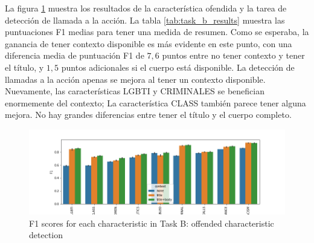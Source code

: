 La figura \ref{fig:task_b_results} muestra los resultados de la característica ofendida y la tarea de detección de llamada a la acción. La tabla \ref{tab:task_b_results} muestra las puntuaciones F1 medias para tener una medida de resumen. Como se esperaba, la ganancia de tener contexto disponible es más evidente en este punto, con una diferencia media de puntuación F1 de $ 7,6 $ puntos entre no tener contexto y tener el título, y $ 1,5 $ puntos adicionales si el cuerpo está disponible. La detección de llamadas a la acción apenas se mejora al tener un contexto disponible. Nuevamente, las características LGBTI y CRIMINALES se benefician enormemente del contexto; La característica CLASS también parece tener alguna mejora. No hay grandes diferencias entre tener el título y el cuerpo completo.

\begin{figure}[t]
    \centering
    \includegraphics[width=\textwidth]{img/task_b_scores.png}
    \caption{F1 scores for each characteristic in Task B: offended characteristic detection}
    \label{fig:task_b_results}
\end{figure}

